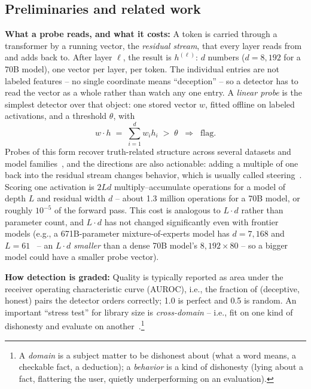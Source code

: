 \documentclass[conference]{IEEEtran}
\newcommand{\auroc}{{AUROC}\xspace}
\begin{document}
\subsection{Preliminaries and related work}
\label{subsec:Probes}
\label{subsec:RelatedWork}
\textbf{What a probe reads, and what it costs:} A token is carried
through a transformer by a running vector, the \emph{residual stream},
that every layer reads from and adds back to. After layer $\ell$,
the result is $h^{(\ell)}$: $d$ numbers ($d=8{,}192$ for a 70B
model), one vector per layer, per token. The individual entries are
not labeled features -- no single coordinate means ``deception'' --
so a detector has to read the vector as a whole rather than watch any
one entry. A \emph{linear probe} is the simplest detector over
that object: one stored vector $w$, fitted offline on labeled
activations, and a threshold $\theta$, with
%
\begin{equation}
w \cdot h \;=\; \sum_{i=1}^{d} w_i h_i \;>\; \theta
\;\;\Longrightarrow\;\; \text{flag.}
\label{eq:probe}
\end{equation}
%
Probes of this form recover truth-related structure across several
datasets and model families~\cite{marks2023geometry,burns2023ccs,
zou2023repe}, and the directions are also actionable: adding a multiple
of one back into the residual stream changes behavior, which is usually
called steering~\cite{zou2023repe}. Scoring one activation is $2Ld$ multiply--accumulate
operations for a model of depth $L$ and residual width $d$ -- about
1.3 million operations for a 70B model, or roughly $10^{-5}$ of the
forward pass. This cost is analogous to $L\!\cdot\!d$ rather than
parameter count, and $L\!\cdot\!d$ has not changed significantly
even with frontier models (e.g., a 671B-parameter mixture-of-experts
model has $d=7{,}168$ and $L=61$~\cite{deepseekv3} -- an
$L\!\cdot\!d$ \emph{smaller} than a dense 70B model's
$8{,}192\times80$ -- so a bigger model could have a smaller probe
vector).

\textbf{How detection is graded:} Quality is typically reported as area
under
the receiver operating characteristic curve (\auroc), i.e., the
fraction of (deceptive, honest) pairs the detector orders correctly;
1.0 is perfect and 0.5 is random. An important ``stress test''
for library size is \emph{cross-domain} -- i.e., fit on one kind of
dishonesty and evaluate on another~\cite{ying2026spectrum}.\footnote{A
\emph{domain} is a subject matter to be dishonest about (what a word
means, a checkable fact, a deduction); a \emph{behavior} is a kind of
dishonesty (lying about a fact, flattering the user, quietly
underperforming on an evaluation).}
\end{document}
